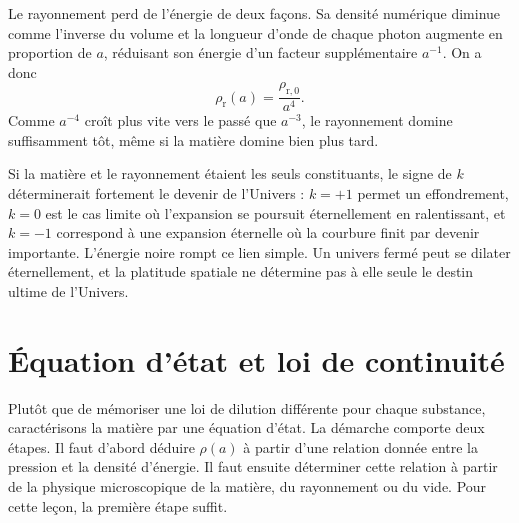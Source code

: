 \begin{classroomqa}
\end{classroomqa}

Le rayonnement perd de l’énergie de deux façons. Sa densité numérique diminue comme l’inverse du volume et la longueur d’onde de chaque photon augmente en proportion de \(a\), réduisant son énergie d’un facteur supplémentaire \(a^{-1}\). On a donc
\begin{equation}
\rho_{\mathrm r}(a)=\frac{\rho_{\mathrm r,0}}{a^4}.
\label{eq:c04-radiation-scaling}
\end{equation}
Comme \(a^{-4}\) croît plus vite vers le passé que \(a^{-3}\), le rayonnement domine suffisamment tôt, même si la matière domine bien plus tard.

Si la matière et le rayonnement étaient les seuls constituants, le signe de \(k\) déterminerait fortement le devenir de l’Univers : \(k=+1\) permet un effondrement, \(k=0\) est le cas limite où l’expansion se poursuit éternellement en ralentissant, et \(k=-1\) correspond à une expansion éternelle où la courbure finit par devenir importante. L’énergie noire rompt ce lien simple. Un univers fermé peut se dilater éternellement, et la platitude spatiale ne détermine pas à elle seule le destin ultime de l’Univers.

\section{Équation d’état et loi de continuité}

Plutôt que de mémoriser une loi de dilution différente pour chaque substance, caractérisons la matière par une équation d’état. La démarche comporte deux étapes. Il faut d’abord déduire \(\rho(a)\) à partir d’une relation donnée entre la pression et la densité d’énergie. Il faut ensuite déterminer cette relation à partir de la physique microscopique de la matière, du rayonnement ou du vide. Pour cette leçon, la première étape suffit.

